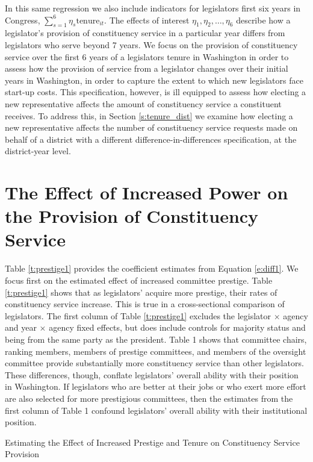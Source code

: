 \documentclass[12pt]{article}
\begin{document}
In this same regression we also include indicators for legislators first six years in Congress,  $ \sum_{s = 1}^{6} \eta_{s} \text{tenure}_{it}$.  The effects of interest $\eta_{1}, \eta_{2}, \hdots, \eta_{6}$ describe how a legislator's provision of constituency service in a particular year differs from legislators who serve beyond 7 years.  We focus on the provision of constituency service over the first 6 years of a legislators tenure in Washington in order to assess how the provision of service from a legislator changes over their initial years in Washington, in order to capture the extent to which new legislators face start-up costs. This specification, however, is ill equipped to assess how electing a new representative affects the amount of constituency service a constituent receives.  To address this, in Section \ref{s:tenure_dist} we examine how electing a new representative affects the number of constituency service requests made on behalf of a district with a different difference-in-differences specification, at the district-year level.    

\section{The Effect of Increased Power on the Provision of Constituency Service}
Table \ref{t:prestige1} provides the coefficient estimates from Equation \ref{e:diff1}. We focus first on the estimated effect of increased committee prestige.  Table \ref{t:prestige1} shows that as legislators' acquire more prestige, their rates of constituency service increase. This is true in a cross-sectional comparison of legislators.  The first column of Table \ref{t:prestige1} excludes the legislator $\times$ agency  and year $\times$ agency fixed effects, but does include controls for majority status and being from the same party as the president.  Table 1 shows that committee chairs, ranking members, members of prestige committees, and members of the oversight committee provide substantially more constituency service than other legislators.  These differences, though, conflate legislators' overall ability with their position in Washington.  If legislators who are better at their jobs or who exert more effort are also selected for more prestigious committees, then the estimates from the first column of Table 1 confound legislators' overall ability with their institutional position.    


\begin{table}[hbt!]
\caption{Estimating the Effect of Increased Prestige and Tenure on Constituency Service Provision} \label{t:prestige1}

\begin{minipage}{\textwidth}
\begin{center}

\end{center}
\end{minipage}
\end{table}
\end{document}
